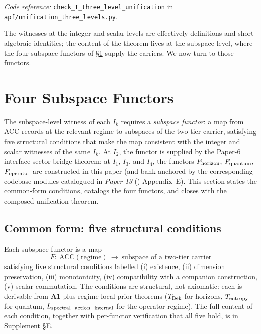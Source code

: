 \documentclass[11pt]{article}
\newcommand{\coderef}[2]{\smallskip\noindent\textit{Code reference:} \texttt{#1} in \texttt{#2}.}
\newcommand{\paperref}[2]{\emph{Paper #1} (\emph{#2})}
\newcommand{\Aone}{\textbf{A1}}
\begin{document}
\coderef{check\_T\_three\_level\_unification}{apf/unification\_three\_levels.py}

\smallskip

The witnesses at the integer and scalar levels are effectively definitions and short algebraic identities; the content of the theorem lives at the subspace level, where the four subspace functors of \S\ref{sec:subspace_functors} supply the carriers. We now turn to those functors.

\section{Four Subspace Functors}\label{sec:subspace_functors}

The subspace-level witness of each $I_k$ requires a \emph{subspace functor}: a map from ACC records at the relevant regime to subspaces of the two-tier carrier, satisfying five structural conditions that make the map consistent with the integer and scalar witnesses of the same $I_k$. At $I_2$, the functor is supplied by the Paper-6 interface-sector bridge theorem; at $I_1$, $I_3$, and $I_4$, the functors $F_{\rm horizon}$, $F_{\rm quantum}$, $F_{\rm operator}$ are constructed in this paper (and bank-anchored by the corresponding codebase modules catalogued in \paperref{13}{} Appendix~E). This section states the common-form conditions, catalogs the four functors, and closes with the composed unification theorem.

\subsection{Common form: five structural conditions}\label{sec:subspace_functors_conditions}

Each subspace functor is a map
\[
F :\ \mathrm{ACC}(\text{regime}) \ \longrightarrow\ \text{subspace of a two-tier carrier}
\]
satisfying five structural conditions labelled (i) existence, (ii) dimension preservation, (iii) monotonicity, (iv) compatibility with a companion construction, (v) scalar commutation.  The conditions are structural, not axiomatic: each is derivable from \Aone{} plus regime-local prior theorems ($T_{\rm Bek}$ for horizons, $T_{\rm entropy}$ for quantum, $L_{\rm spectral\_action\_internal}$ for the operator regime).  The full content of each condition, together with per-functor verification that all five hold, is in Supplement \S E.
\end{document}

